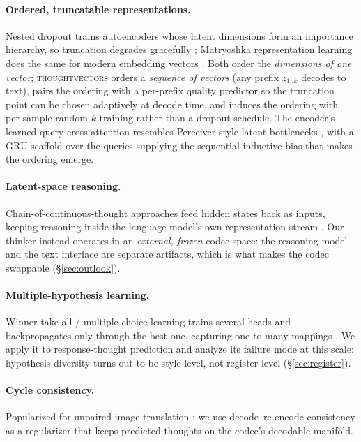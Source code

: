 \documentclass[11pt]{article}
\newcommand{\thoughtvec}{\textsc{thoughtvectors}}
\begin{document}
\paragraph{Ordered, truncatable representations.} Nested dropout trains
autoencoders whose latent dimensions form an importance hierarchy, so
truncation degrades gracefully \citep{rippel2014nested}; Matryoshka
representation learning does the same for modern embedding vectors
\citep{kusupati2022matryoshka}. Both order the \emph{dimensions of one
vector}; \thoughtvec{} orders a \emph{sequence of vectors} (any prefix
$z_{1..k}$ decodes to text), pairs the ordering with a per-prefix quality
predictor so the truncation point can be chosen adaptively at decode time,
and induces the ordering with per-sample random-$k$ training rather than a
dropout schedule. The encoder's learned-query cross-attention resembles
Perceiver-style latent bottlenecks \citep{jaegle2021perceiver}, with a GRU
scaffold over the queries supplying the sequential inductive bias that makes
the ordering emerge.

\paragraph{Latent-space reasoning.} Chain-of-continuous-thought approaches
feed hidden states back as inputs, keeping reasoning inside the language
model's own representation stream \citep{hao2024coconut}. Our thinker
instead operates in an \emph{external, frozen} codec space: the reasoning
model and the text interface are separate artifacts, which is what makes the
codec swappable (\S\ref{sec:outlook}).

\paragraph{Multiple-hypothesis learning.} Winner-take-all / multiple choice
learning trains several heads and backpropagates only through the best one,
capturing one-to-many mappings \citep{guzman2012mcl,lee2016smcl}. We apply
it to response-thought prediction and analyze its failure mode at this
scale: hypothesis diversity turns out to be style-level, not register-level
(\S\ref{sec:register}).

\paragraph{Cycle consistency.} Popularized for unpaired image translation
\citep{zhu2017cyclegan}; we use decode--re-encode consistency as a
regularizer that keeps predicted thoughts on the codec's decodable manifold.
\end{document}
